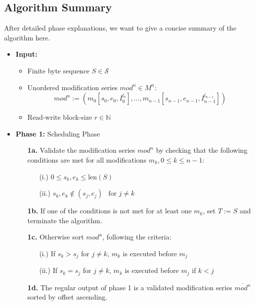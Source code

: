 \documentclass[english, 10pt, openright, twocolumn, landscape, twoside, notitlepage, a4paper, pdftex]		
{article}
\begin{document}
\subsection{Algorithm Summary}%
\label{sec:AlgorithmSummary}%

After detailed phase explanations, we want to give a concise summary of the algorithm here.

\begin{itemize}
\item \textbf{Input:}
\begin{itemize}
\item Finite byte sequence $S\in\mathcal{S}$
\item Unordered modification series $mod^{n}\in M^{n}$:
\[mod^{n}:=\left(m_{0}[s_{0}, e_{0}, I_{0}^{l_{0}}],\ldots,m_{n-1}[s_{n-1}, e_{n-1}, I_{n-1}^{l_{n-1}}]\right)\] 
\item Read-write block-size $r\in\mathbb{N}$
\end{itemize}
\item \textbf{Phase 1:} Scheduling Phase
\begin{enumerate}
\item[\textbf{1a.}] Validate the modification series $mod^{n}$ by checking that the following conditions are met for all modifications $m_{k}, 0\leq k\leq n-1$:
\begin{enumerate}
\item[(i.)] $0\leq s_{k},e_{k}\leq \text{len}(S)$
\item[(ii.)] $s_{k},e_{k}\notin(s_{j}, e_{j})\ \ \text{ for } j\neq k$
\end{enumerate}
\item [\textbf{1b.}] If one of the conditions is not met for at least one $m_{k}$, set $T:=S$ and terminate the algorithm.
\item [\textbf{1c.}] Otherwise sort $mod^{n}$, following the criteria:
\begin{enumerate}
\item[(i.)] If $s_{k}>s_{j}$ for $j\neq k$, $m_{k}$ is executed before $m_{j}$
\item[(ii.)] If $s_{k}=s_{j}$ for $j\neq k$, $m_{k}$ is executed before $m_{j}$ if $k<j$
\end{enumerate}
\item [\textbf{1d.}] The regular output of phase 1 is a validated modification series $\overline{mod^{n}}$ sorted by offset ascending.
\end{enumerate}

\end{itemize}
\end{document}
